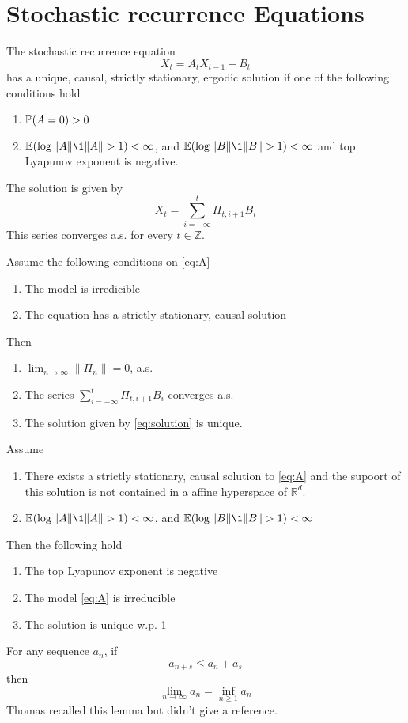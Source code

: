\documentclass[12pt]{article}
\begin{document}
\section{Stochastic recurrence Equations}
\begin{theorem}
The stochastic recurrence equation
\begin{equation}
  \label{eq:A}
  X_t = A_t X_{t-1} + B_t  
\end{equation}
has a unique, causal, strictly stationary, ergodic solution if one of the following
conditions hold
\begin{enumerate}
\item $\P(A = 0) > 0$
\item $\E(\log\|A\| \1{\|A\| > 1}) < \infty$, and $\E(\log\|B\|
  \1{\|B\| > 1}) < \infty$ and top Lyapunov exponent is negative.
\end{enumerate}
The solution is given by
\begin{equation}
  \label{eq:solution}
  X_t = \sum_{i=-\infty}^t \Pi_{t, i+1} B_i  
\end{equation}
This series converges a.s. for every $t \in \mathds Z$.
\end{theorem}

\begin{theorem}
  Assume the following conditions on \eqref{eq:A}
  \begin{enumerate}
  \item The model is irredicible
  \item The equation has a strictly stationary, causal solution
  \end{enumerate}
  Then
  \begin{enumerate}
  \item $\lim_{n \to \infty} \|\Pi_n\| = 0$, a.s.
  \item The series $\sum_{i=-\infty}^t \Pi_{t, i+1} B_i$ converges
    a.s.
    \item The solution given by \eqref{eq:solution} is unique.
  \end{enumerate}
\end{theorem}

\begin{theorem}
  Assume
  \begin{enumerate}
  \item There exists a strictly stationary, causal solution to
  \eqref{eq:A} and the supoort of this solution is not contained in a
  affine hyperspace of $\mathds R^d$.
  \item $\E(\log\|A\| \1{\|A\| > 1}) < \infty$, and $\E(\log\|B\|
    \1{\|B\| > 1}) < \infty$
  \end{enumerate}
  Then the following hold
  \begin{enumerate}
  \item The top Lyapunov exponent is negative
  \item The model \eqref{eq:A} is irreducible
  \item The solution is unique w.p. 1
  \end{enumerate}
\end{theorem}

\begin{lemma}
  For any sequence $a_n$, if
  \[
  a_{n+s} \leq a_n + a_s
  \]
  then
  \[
  \lim_{n \to \infty} a_n = \inf_{n \geq 1} a_n
  \]
  Thomas recalled this lemma but didn't give a reference.
\end{lemma}


\end{document}
